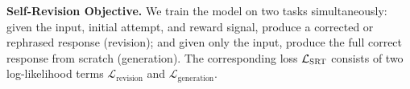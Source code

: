  




\textbf{Self-Revision Objective.} We train the model on two tasks simultaneously: given the input, initial attempt, and reward signal, produce a corrected or rephrased response (revision); and given only the input, produce the full correct response from scratch (generation). The corresponding loss $\mathcal{L}_{\text{\textsc{SRT}{}}}$ consists of two log-likelihood terms $\mathcal{L}_{\text{revision}}$ and $\mathcal{L}_{\text{generation}}$.

